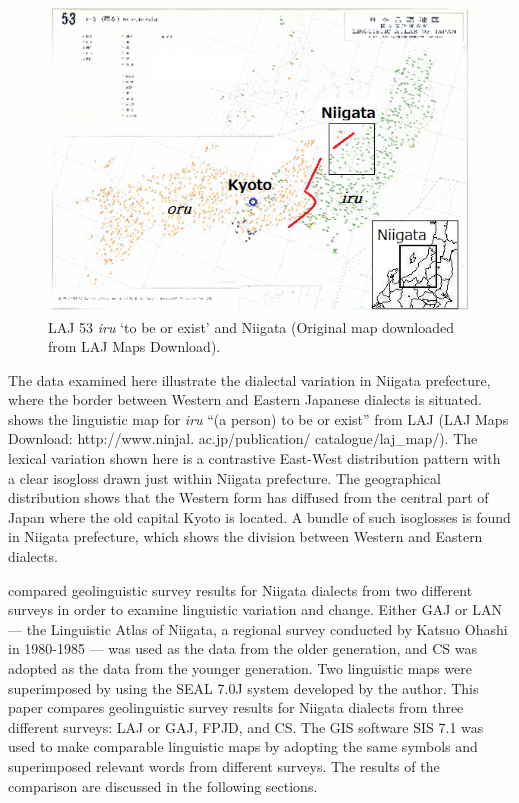 \documentclass[output=paper]{LSP/langsci}
\begin{document}
\begin{figure}
\includegraphics[width=1\textwidth]{illustrations/fuku2_fig1}
\caption{LAJ 53 \textit{iru} `to be or exist' and Niigata (Original map downloaded from LAJ Maps Download).}
\label{fig:1}
\end{figure}

The data examined here illustrate the dialectal variation in Niigata prefecture, where the border between Western and Eastern Japanese dialects is situated.   shows the linguistic map for \textit{iru} “(a person) to be or exist” from LAJ (LAJ Maps Download: http://www.ninjal. ac.jp/publication/ catalogue/laj\_map/).  The lexical variation shown here is a contrastive East-West distribution pattern with a clear isogloss drawn just within Niigata prefecture.  The geographical distribution shows that the Western form has diffused from the central part of Japan where the old capital Kyoto is located.  A bundle of such isoglosses is found in Niigata prefecture, which shows the division between Western and Eastern dialects.

\citet{fukushima_superimposing_2007} compared geolinguistic survey results for Niigata dialects from two different surveys in order to examine linguistic variation and change.  Either GAJ or LAN --- the Linguistic Atlas of Niigata, a regional survey conducted by Katsuo Ohashi in 1980-1985 \citep{ohashi_linguistic_1998} --- was used as the data from the older generation, and CS was adopted as the data from the younger generation.  Two linguistic maps were superimposed by using the SEAL 7.0J system developed by the author.  This paper compares geolinguistic survey results for Niigata dialects from three different surveys: LAJ or GAJ, FPJD, and CS.  The GIS software SIS 7.1 was used to make comparable linguistic maps by adopting the same symbols and superimposed relevant words from different surveys.  The results of the comparison are discussed in the following sections.
\end{document}
